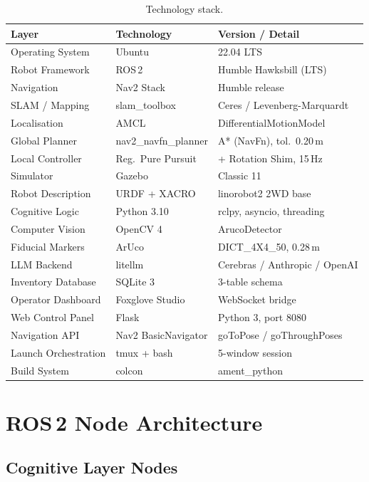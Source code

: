 \documentclass[12pt,a4paper]{report}
\begin{document}
\begin{table}[H]
\centering
\caption{Technology stack.}
\label{tab:techstack}
\begin{tabular}{lll}
\toprule
\textbf{Layer} & \textbf{Technology} & \textbf{Version / Detail} \\
\midrule
Operating System & Ubuntu & 22.04 LTS \\
Robot Framework & ROS\,2 & Humble Hawksbill (LTS) \\
Navigation & Nav2 Stack & Humble release \\
SLAM / Mapping & slam\_toolbox & Ceres / Levenberg-Marquardt \\
Localisation & AMCL & DifferentialMotionModel \\
Global Planner & nav2\_navfn\_planner & A* (NavFn), tol.\ 0.20\,m \\
Local Controller & Reg.\ Pure Pursuit & + Rotation Shim, 15\,Hz \\
Simulator & Gazebo & Classic 11 \\
Robot Description & URDF + XACRO & linorobot2 2WD base \\
Cognitive Logic & Python 3.10 & rclpy, asyncio, threading \\
Computer Vision & OpenCV 4 & ArucoDetector \\
Fiducial Markers & ArUco & DICT\_4X4\_50, 0.28\,m \\
LLM Backend & litellm & Cerebras / Anthropic / OpenAI \\
Inventory Database & SQLite 3 & 3-table schema \\
Operator Dashboard & Foxglove Studio & WebSocket bridge \\
Web Control Panel & Flask & Python 3, port 8080 \\
Navigation API & Nav2 BasicNavigator & goToPose / goThroughPoses \\
Launch Orchestration & tmux + bash & 5-window session \\
Build System & colcon & ament\_python \\
\bottomrule
\end{tabular}
\end{table}

\section{ROS\,2 Node Architecture}

\subsection{Cognitive Layer Nodes}
\end{document}
